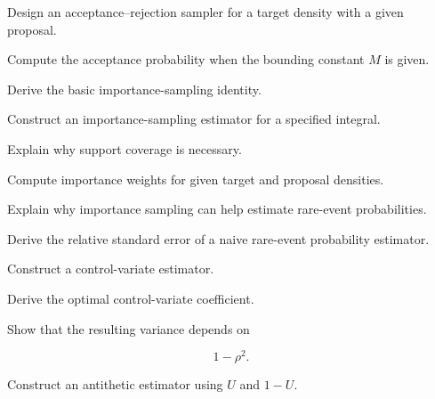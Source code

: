 \begin{exercise}[3]
Design an acceptance--rejection sampler for a target density with a given
proposal.
\end{exercise}

\begin{exercise}[3]
Compute the acceptance probability when the bounding constant \(M\) is
given.
\end{exercise}

\begin{exercise}[2]
Derive the basic importance-sampling identity.
\end{exercise}

\begin{exercise}[3]
Construct an importance-sampling estimator for a specified integral.
\end{exercise}

\begin{exercise}[3]
Explain why support coverage is necessary.
\end{exercise}

\begin{exercise}[3]
Compute importance weights for given target and proposal densities.
\end{exercise}

\begin{exercise}[3]
Explain why importance sampling can help estimate rare-event
probabilities.
\end{exercise}

\begin{exercise}[3]
Derive the relative standard error of a naive rare-event probability
estimator.
\end{exercise}

\begin{exercise}[2]
Construct a control-variate estimator.
\end{exercise}

\begin{exercise}[3]
Derive the optimal control-variate coefficient.
\end{exercise}

\begin{exercise}[3]
Show that the resulting variance depends on

\[
1-\rho^2.
\]
\end{exercise}

\begin{exercise}[2]
Construct an antithetic estimator using \(U\) and \(1-U\).
\end{exercise}

